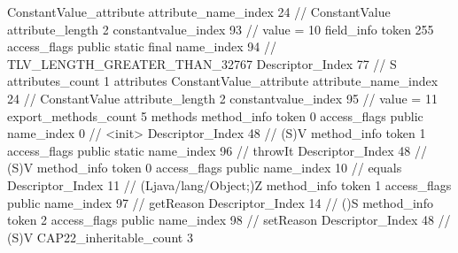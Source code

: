 {{{{{{				ConstantValue_attribute {
					attribute_name_index	24		// ConstantValue
					attribute_length	2
					constantvalue_index	93		// value = 10
				}
				}
			}
			field_info {
				token	255
				access_flags	public static final
				name_index	94		// TLV_LENGTH_GREATER_THAN_32767
				Descriptor_Index	77		// S
				attributes_count	1
				attributes {
				ConstantValue_attribute {
					attribute_name_index	24		// ConstantValue
					attribute_length	2
					constantvalue_index	95		// value = 11
				}
				}
			}
			}
			export_methods_count	5
			methods {
				method_info {
					token	0
					access_flags	public
					name_index	0		// <init>
					Descriptor_Index	48		// (S)V
				}
				method_info {
					token	1
					access_flags	public static
					name_index	96		// throwIt
					Descriptor_Index	48		// (S)V
				}
				method_info {
					token	0
					access_flags	public
					name_index	10		// equals
					Descriptor_Index	11		// (Ljava/lang/Object;)Z
				}
				method_info {
					token	1
					access_flags	public
					name_index	97		// getReason
					Descriptor_Index	14		// ()S
				}
				method_info {
					token	2
					access_flags	public
					name_index	98		// setReason
					Descriptor_Index	48		// (S)V
				}
			}
			CAP22_inheritable_count	3
		}
	}
}
